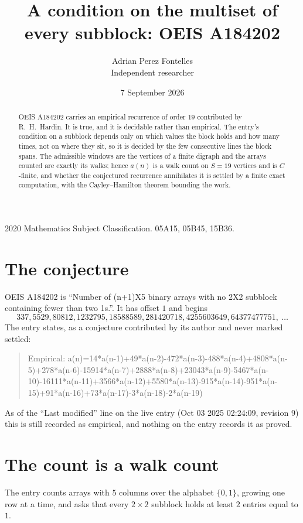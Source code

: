 \documentclass[11pt,a4paper]{article}
\title{A condition on the multiset of every subblock: OEIS A184202}
\author{Adrian Perez Fontelles\\ \small Independent researcher}
\date{7 September 2026}
\theoremstyle{plain}
\theoremstyle{definition}
\begin{document}
\maketitle

\begin{abstract}
OEIS A184202 carries an empirical recurrence of order $19$ contributed by R.~H.~Hardin. It is
true, and it is decidable rather than empirical. The entry's condition on a subblock depends
only on which values the block holds and how many times, not on where they sit, so it is
decided by the few consecutive lines the block spans. The admissible windows are the vertices
of a finite digraph and the arrays counted are exactly its walks; hence $a(n)$ is a walk count
on $S=19$ vertices and is $C$-finite, and whether the conjectured recurrence annihilates it
is settled by a finite exact computation, with the Cayley--Hamilton theorem bounding the
work.
\end{abstract}

\noindent\small 2020 Mathematics Subject Classification. 05A15, 05B45, 15B36.\normalsize

\section{The conjecture}

OEIS A184202 is ``Number of (n+1)X5 binary arrays with no 2X2 subblock containing fewer than two 1s.''. It has offset $1$ and begins
\[
337, 5529, 80812, 1232795, 18588589, 281420718, 4255603649, 64377477751,\ \dots
\]
The entry states, as a conjecture contributed by its author and never marked settled:
\begin{quote}
Empirical: a(n)=14*a(n-1)+49*a(n-2)-472*a(n-3)-488*a(n-4)+4808*a(n-5)+278*a(n-6)-15914*a(n-7)+2888*a(n-8)+23043*a(n-9)-5467*a(n-10)-16111*a(n-11)+3566*a(n-12)+5580*a(n-13)-915*a(n-14)-951*a(n-15)+91*a(n-16)+73*a(n-17)-3*a(n-18)-2*a(n-19)
\end{quote}
As of the ``Last modified'' line on the live entry (Oct 03 2025 02:24:09, revision 9) this is still
recorded as empirical, and nothing on the entry records it as proved.

\section{The count is a walk count}

The entry counts arrays with $5$ columns over the alphabet $\{0,1\}$, growing one row at a time, and asks that every $2\times2$ subblock holds at least $2$ entries equal to $1$.
\end{document}

